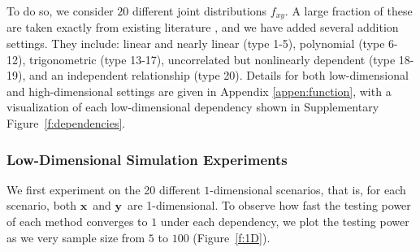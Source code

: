 \documentclass[11pt]{article}
\newcommand{\note}[2][]{\added[#1,remark={#2}]{}}
\providecommand{\sct}[1]{{\sc \texttt{#1}}}
\providecommand{\mb}[1]{\boldsymbol{#1}}
\newcommand{\Mgc}{\sct{Mgc}}
\newcommand{\Hhg}{\sct{Hhg}}
\newcommand{\Dcorr}{\sct{Dcorr}}
\newcommand{\Mcorr}{\sct{Mcorr}}
\newcommand{\Mantel}{\sct{Mantel}}
\newcommand{\cs}[1]{{\note{cs: #1}}}
\newcommand{\mbx}{\ensuremath{\mb{x}}}
\newcommand{\mby}{\ensuremath{\mb{y}}}
\begin{document}

To do so, we consider  $20$ different joint distributions $f_{xy}$. A large fraction of these are taken exactly from existing literature \cite{SzekelyRizzoBakirov2007, SimonTibshirani2012, GorfineHellerHeller2012, HellerGorfine2013}, and we have added several addition settings.  They include: 
linear and nearly linear  (type 1-5), 
polynomial   (type 6-12), 
trigonometric (type 13-17), 
uncorrelated but nonlinearly dependent  (type 18-19), 
and an independent relationship (type 20).
Details for both low-dimensional and high-dimensional settings are given in Appendix \ref{appen:function}, with a visualization of each low-dimensional dependency shown in Supplementary Figure~\ref{f:dependencies}.

\subsubsection{Low-Dimensional Simulation Experiments}
\label{numer1}



We first experiment on the 20 different $1$-dimensional scenarios, that is, for each scenario, both \mbx~and \mby~are 1-dimensional. To observe how fast the testing power of each method converges to $1$ under each dependency, we plot the testing power as we very sample  size from $5$ to $100$  (Figure~\ref{f:1D}).
\cs{deleted, technical, it should go in the figure caption and the appendix:, based on $r=10$,$000$ Monte-Carlo replicates at type $1$ error level $\alpha=0.05$. Note that $2$,$000$ additional MC replicates are used for optimal scale estimation for \Mgc.} %
\end{document}
